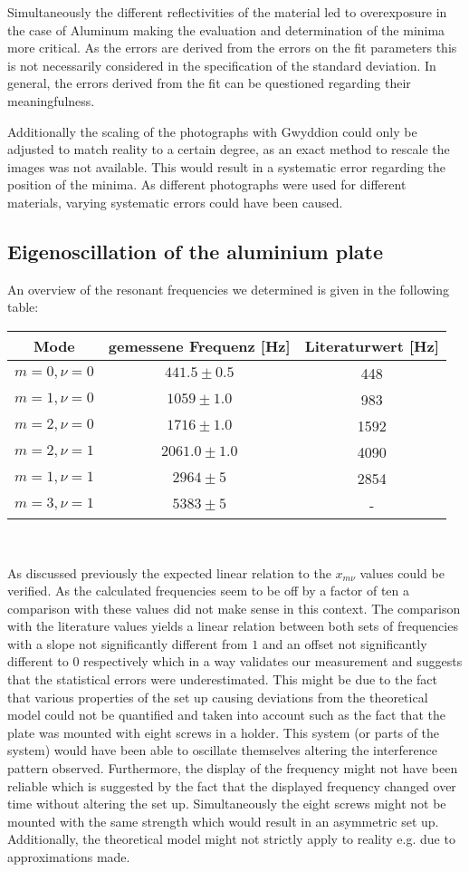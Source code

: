 Simultaneously the different reflectivities of the material led to overexposure in the case of Aluminum making the evaluation and determination of the minima more critical. As the errors are derived from the errors on the fit parameters this is not necessarily considered in the specification of the standard deviation. In general, the errors derived from the fit can be questioned regarding their meaningfulness.

Additionally the scaling of the photographs with Gwyddion could only be adjusted to match reality to a certain degree, as an exact method to rescale the images was not available. This would result in a systematic error regarding the position of the minima. As different photographs were used for different materials, varying systematic errors could have been caused.

\subsection{Eigenoscillation of the aluminium plate}

An overview of the resonant frequencies we determined is given in the following table:

{\centering{}
\begin{tabular}{c|c|c}
Mode 		& gemessene Frequenz [Hz] 	& Literaturwert [Hz]\\ \hline\hline
$m=0,\nu=0$	& $441.5\pm0.5$					& 448	\\ \hline
$m=1,\nu=0$	& $1059\pm1.0$				& 983	\\ \hline
$m=2,\nu=0$	& $1716\pm1.0$				& 1592	\\ \hline
$m=2,\nu=1$	& $2061.0\pm1.0$				& 4090	\\ \hline
$m=1,\nu=1$	& $2964\pm5$				& 2854 \\ \hline
$m=3,\nu=1$	& $5383\pm5$				&-
\end{tabular} \\}
\vskip 0.5cm

As discussed previously the expected linear relation to the $x_{m\nu}$ values could be verified. As the calculated frequencies seem to be off by a factor of ten a comparison with these values did not make sense in this context. The comparison with the literature values yields a linear relation between both sets of frequencies with a slope not significantly different from $1$ and an offset not significantly different to $0$ respectively which in a way validates our measurement and suggests that the statistical errors were underestimated. This might be due to the fact that various properties of the set up causing deviations from the theoretical model could not be quantified and taken into account such as the fact that the plate was mounted with eight screws in a holder. This system (or parts of the system) would have been able to oscillate themselves altering the interference pattern observed. Furthermore, the display of the frequency might not have been reliable which is suggested by the fact that the displayed frequency changed over time without altering the set up. Simultaneously the eight screws might not be mounted with the same strength which would result in an asymmetric set up. Additionally, the theoretical model might not strictly apply to reality e.g. due to approximations made.

